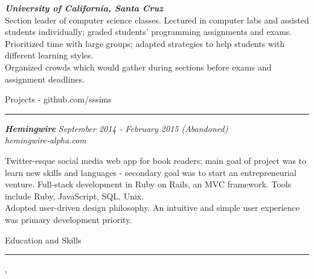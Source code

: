 \documentclass[10pt]{article}
\newcommand{\simsbullet}{{\raisebox{2pt}{\tiny $\bullet$}}\hspace{8pt}}
\begin{document}
\setlength{\leftskip}{0pt}

\vskip 16pt

{\bfseries\itshape\sffamily University of California, Santa Cruz} \hfill {\itshape{}} \\
{\itshape{}}
\vskip 4pt
\setlength{\leftskip}{16pt}
Section leader of computer science classes. Lectured in computer labs and assisted students individually; graded students' programming assignments and exams. 
\vskip 4pt
\simsbullet Prioritized time with large groups; adapted strategies to help students with different learning styles. \\
\simsbullet Organized crowds which would gather during sections before exams and assignment deadlines. 

\setlength{\leftskip}{0pt}

\vskip 18pt


{\Large\sffamily Projects {\small - github.com/sssims}}
\vskip 1pt
\hrule
\vskip 6pt
{\bfseries\itshape\sffamily Hemingwire} \hfill \textsf{\textit{September 2014 - February 2015 (Abandoned)}}\\
\textit{\textsf{hemingwire-alpha.com}} 

\setlength{\leftskip}{16pt}

Twitter-esque social media web app for book readers; main goal of project was to learn new skills and languages - secondary goal was to start an entrepreneurial venture. 
\vskip 4pt
\simsbullet Full-stack development in Ruby on Rails, an MVC framework. Tools include Ruby, JavaScript, SQL, Unix.\\
\simsbullet Adopted user-driven design philosophy. An intuitive and simple user experience was primary development priority.

\setlength{\leftskip}{0pt}

\vskip 18pt

{\Large\sffamily Education and Skills}
\vskip 4pt
\hrule
\vskip 6pt
{}
\vskip 2pt
\hspace*{12pt} {\itshape{}}, {} \\
\hspace*{12pt} {\itshape{}}
\end{document}
